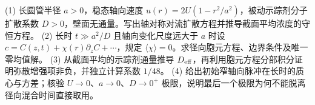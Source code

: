 (1) 长圆管半径 \(a>0\)，稳态轴向速度 \(u(r)=2U(1-r^2/a^2)\)，被动示踪剂分子扩散系数 \(D>0\)，壁面无通量。写出轴对称对流扩散方程并推导截面平均浓度的守恒方程。
(2) 长时 \(t\gg a^2/D\) 且轴向变化尺度远大于 \(a\) 时设 \(c=C(z,t)+\chi(r)\partial_zC+\cdots\)，规定 \(\langle\chi\rangle=0\)。求径向胞元方程、边界条件及唯一零均值解。
(3) 从截面平均的示踪剂通量推导 \(D_{\rm eff}\)，再利用胞元方程分部积分证明弥散增强项非负，并独立计算系数 \(1/48\)。
(4) 给出初始窄轴向脉冲在长时的质心与方差；核验 \(U\to0\)、\(a\to0\)、\(D\to0^+\) 极限，说明最后一个极限为何不能脱离径向混合时间直接取用。
